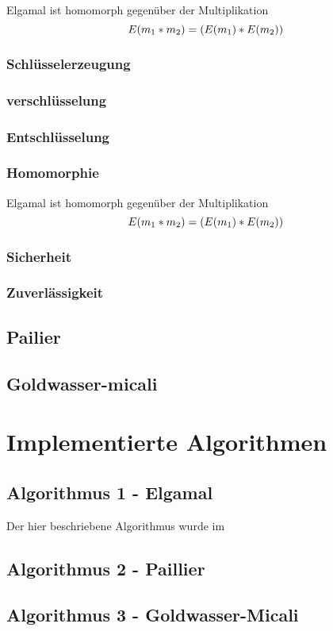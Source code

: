 Elgamal ist homomorph gegenüber der Multiplikation
$$ E(m \textsubscript{1} * m \textsubscript{2}) = (E(m \textsubscript{1}) * E(m \textsubscript{2}))$$

\subsubsection{Schlüsselerzeugung}

\subsubsection{verschlüsselung}

\subsubsection{Entschlüsselung}

\subsubsection{Homomorphie }
Elgamal ist homomorph gegenüber der Multiplikation
$$ E(m \textsubscript{1} * m \textsubscript{2}) = (E(m \textsubscript{1}) * E(m \textsubscript{2}))$$

\subsubsection{Sicherheit}

\subsubsection{Zuverlässigkeit}



\subsection{Pailier}
\label{sec:Sec1.3.2}



\subsection{Goldwasser-micali}
\label{sec:Sec1.3.3}

\section{Implementierte Algorithmen}

\subsection{Algorithmus 1 - Elgamal}

Der hier beschriebene Algorithmus wurde im 

\subsection{Algorithmus 2 - Paillier}
\label{sec:Sec2.3}


\subsection{Algorithmus 3 - Goldwasser-Micali}
\label{sec:Sec2.4}